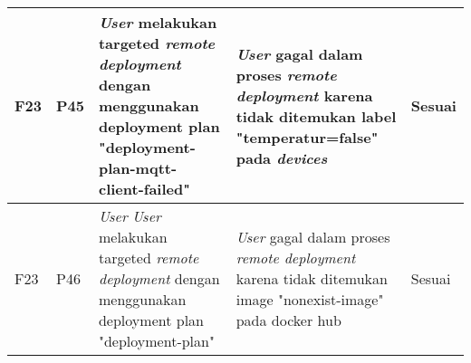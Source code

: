\begin{table}[ht]
\begin{tabular}{|p{2cm}|p{2cm}|p{3cm}|p{3cm}|p{1.5cm}|}
    \hline
    F23                       & P45                      & \textit{User} melakukan targeted \textit{remote deployment} dengan menggunakan deployment plan "deployment-plan-mqtt-client-failed" & \textit{User} gagal dalam proses \textit{remote deployment} karena tidak ditemukan label "temperatur=false" pada \textit{devices} & Sesuai  \\
    \hline
    F23                       & P46                      & \textit{User} \textit{User} melakukan targeted \textit{remote deployment} dengan menggunakan deployment plan "deployment-plan"      & \textit{User} gagal dalam proses \textit{remote deployment} karena tidak ditemukan image "nonexist-image" pada docker hub         & Sesuai  \\
    \hline
  \end{tabular}
\end{table}
\egroup